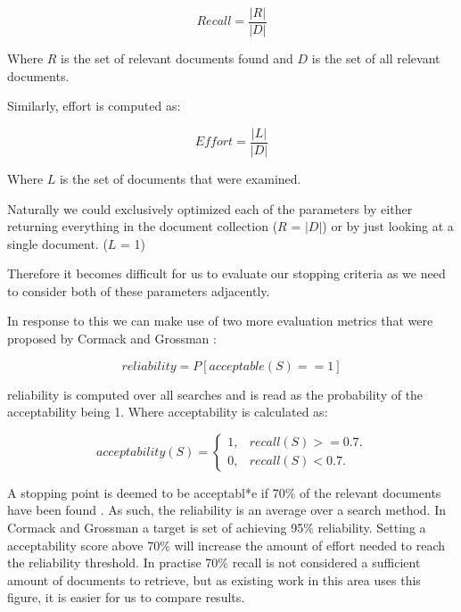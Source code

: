 \begin{equation}
Recall = \frac{|R|}{|D|}
\end{equation}

Where $R$ is the set of relevant documents found and $D$ is the set of all relevant documents.

Similarly, effort is computed as:

\begin{equation}
Effort = \frac{|L|}{|D|}
\end{equation}

Where $L$ is the set of documents that were examined.

Naturally we could exclusively optimized each of the parameters by either returning everything in the document collection ($R$ = $|D|$) or by just looking at a single document. ($L$ = 1)

Therefore it becomes difficult for us to evaluate our stopping criteria as we need to consider both of these parameters adjacently.

In response to this we can make use of two more evaluation metrics that were proposed by Cormack and Grossman \cite{Cormack2016}:

\begin{equation}
reliability = P [acceptable(S) == 1]
\end{equation}

reliability is computed over all searches and is read as the probability of the acceptability being 1. Where acceptability is calculated as:

\begin{equation}
  acceptability(S)=\begin{cases}
    1, & \text{$recall(S)>=0.7$}.\\
    0, & \text{$recall(S)<0.7$}.
  \end{cases}
\end{equation}

A stopping point is deemed to be acceptabl*e if 70\% of the relevant documents have been found \cite{Cormack2016}. As such, the reliability is an average over a search method. In Cormack and Grossman \cite{Cormack2016} a target is set of achieving 95\% reliability. Setting a acceptability score above 70\% will increase the amount of effort needed to reach the reliability threshold. In practise 70\% recall is not considered a sufficient amount of documents to retrieve, but as existing work in this area uses this figure, it is easier for us to compare results.


